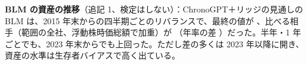\item \textbf{BLM の資産の推移}（追記 1、検定はしない）：ChronoGPT＋リッジの見通しの BLM は、2015 年末からの四半期ごとのリバランスで、最終の値が 、比べる相手（範囲の全社、浮動株時価総額で加重）が （年率の差 ）だった。半年・1 年ごとでも、2023 年末からでも上回った。ただし差の多くは 2023 年以降に開き、資産の水準は生存者バイアスで高く出ている。
